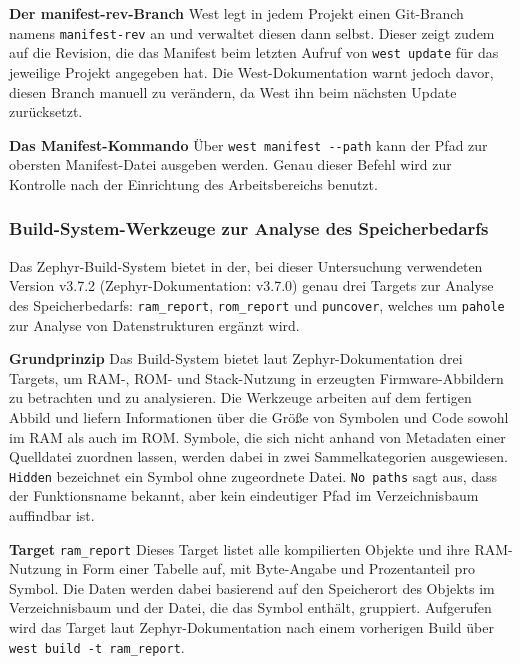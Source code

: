 \textbf{Der manifest-rev-Branch} West legt in jedem Projekt einen Git-Branch namens \lstinline[style=codeinline]|manifest-rev| an und verwaltet diesen dann selbst. Dieser zeigt zudem auf die Revision, die das Manifest beim letzten Aufruf von \lstinline[style=codeinline]|west update| f{\"u}r das jeweilige Projekt angegeben hat. Die West-Dokumentation warnt jedoch davor, diesen Branch manuell zu ver{\"a}ndern, da West ihn beim n{\"a}chsten Update zur{\"u}cksetzt.

\textbf{Das Manifest-Kommando }{\"U}ber \lstinline[style=codeinline]|west manifest --path| kann der Pfad zur obersten Manifest-Datei ausgeben werden. Genau dieser Befehl wird zur Kontrolle nach der Einrichtung des Arbeitsbereichs benutzt.

\subsubsection{Build-System-Werkzeuge zur Analyse des Speicherbedarfs}
Das Zephyr-Build-System bietet in der, bei dieser Untersuchung verwendeten Version v3.7.2 (Zephyr-Dokumentation: v3.7.0) genau drei Targets zur Analyse des Speicherbedarfs: \lstinline[style=codeinline]|ram_report|, \lstinline[style=codeinline]|rom_report| und \lstinline[style=codeinline]|puncover|, welches um \lstinline[style=codeinline]|pahole| zur Analyse von Datenstrukturen erg{\"a}nzt wird.

\textbf{Grundprinzip} Das Build-System bietet laut Zephyr-Dokumentation drei Targets, um RAM-, ROM- und Stack-Nutzung in erzeugten Firmware-Abbildern zu betrachten und zu analysieren. Die Werkzeuge arbeiten auf dem fertigen Abbild und liefern Informationen {\"u}ber die Gr{\"o}{\ss}e von Symbolen und Code sowohl im RAM als auch im ROM. Symbole, die sich nicht anhand von Metadaten einer Quelldatei zuordnen lassen, werden dabei in zwei Sammelkategorien ausgewiesen. \lstinline[style=codeinline]|Hidden| bezeichnet ein Symbol ohne zugeordnete Datei. \lstinline[style=codeinline]|No paths| sagt aus, dass der Funktionsname bekannt, aber kein eindeutiger Pfad im Verzeichnisbaum auffindbar ist.

\textbf{Target }\lstinline[style=codeinline]|ram_report| Dieses Target listet alle kompilierten Objekte und ihre RAM-Nutzung in Form einer Tabelle auf, mit Byte-Angabe und Prozentanteil pro Symbol. Die Daten werden dabei basierend auf den Speicherort des Objekts im Verzeichnisbaum und der Datei, die das Symbol enth{\"a}lt, gruppiert. Aufgerufen wird das Target laut Zephyr-Dokumentation nach einem vorherigen Build {\"u}ber \lstinline[style=codeinline]|west build -t ram_report|.

